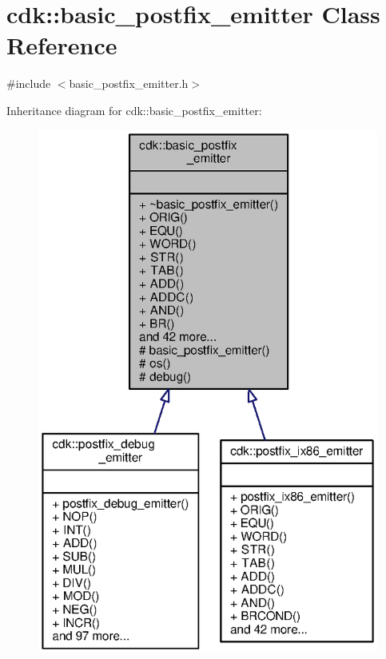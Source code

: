 \section{cdk\+:\+:basic\+\_\+postfix\+\_\+emitter Class Reference}
\label{classcdk_1_1basic__postfix__emitter}


{\ttfamily \#include $<$basic\+\_\+postfix\+\_\+emitter.\+h$>$}



Inheritance diagram for cdk\+:\+:basic\+\_\+postfix\+\_\+emitter\+:
\nopagebreak
\begin{figure}[H]
\begin{center}
\leavevmode
\includegraphics[width=318pt]{classcdk_1_1basic__postfix__emitter__inherit__graph}
\end{center}
\end{figure}


